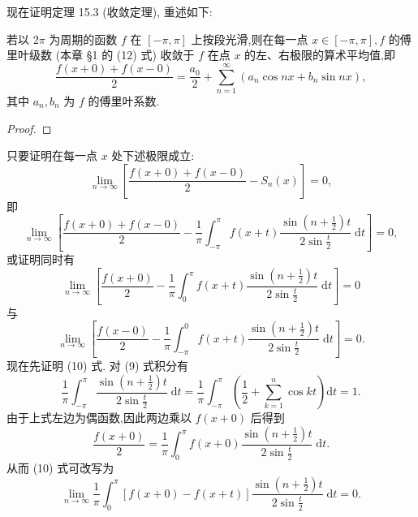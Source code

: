 现在证明定理 15.3 (收敛定理), 重述如下:

若以 \({2\pi }\) 为周期的函数 \(f\) 在 \(\left\lbrack  {-\pi ,\pi }\right\rbrack\) 上按段光滑,则在每一点 \(x \in  \left\lbrack  {-\pi ,\pi }\right\rbrack  ,f\) 的傅里叶级数 (本章 §1 的 (12) 式) 收敛于 \(f\) 在点 \(x\) 的左、右极限的算术平均值,即
\[
\frac{f\left( {x + 0}\right)  + f\left( {x - 0}\right) }{2} = \frac{{a}_{0}}{2} + \mathop{\sum }\limits_{{n = 1}}^{\infty }\left( {{a}_{n}\cos {nx} + {b}_{n}\sin {nx}}\right) ,
\]
其中 \({a}_{n},{b}_{n}\) 为 \(f\) 的傅里叶系数.

\begin{proof}

\end{proof}
只要证明在每一点 \(x\) 处下述极限成立:
\[
\mathop{\lim }\limits_{{n \rightarrow  \infty }}\left\lbrack  {\frac{f\left( {x + 0}\right)  + f\left( {x - 0}\right) }{2} - {S}_{n}\left( x\right) }\right\rbrack   = 0,
\]
即
\[
\mathop{\lim }\limits_{{n \rightarrow  \infty }}\left\lbrack  {\frac{f\left( {x + 0}\right)  + f\left( {x - 0}\right) }{2} - \frac{1}{\pi }{\int }_{-\pi }^{\pi }f\left( {x + t}\right) \frac{\sin \left( {n + \frac{1}{2}}\right) t}{2\sin \frac{t}{2}}\mathrm{\;d}t}\right\rbrack   = 0,
\]
或证明同时有
\[
\mathop{\lim }\limits_{{n \rightarrow  \infty }}\left\lbrack  {\frac{f\left( {x + 0}\right) }{2} - \frac{1}{\pi }{\int }_{0}^{\pi }f\left( {x + t}\right) \frac{\sin \left( {n + \frac{1}{2}}\right) t}{2\sin \frac{t}{2}}\mathrm{\;d}t}\right\rbrack   = 0 \tag{10}
\]
与
\[
\mathop{\lim }\limits_{{n \rightarrow  \infty }}\left\lbrack  {\frac{f\left( {x - 0}\right) }{2} - \frac{1}{\pi }{\int }_{-\pi }^{0}f\left( {x + t}\right) \frac{\sin \left( {n + \frac{1}{2}}\right) t}{2\sin \frac{t}{2}}\mathrm{\;d}t}\right\rbrack   = 0. \tag{11}
\]
现在先证明 (10) 式. 对 (9) 式积分有
\[
\frac{1}{\pi }{\int }_{-\pi }^{\pi }\frac{\sin \left( {n + \frac{1}{2}}\right) t}{2\sin \frac{t}{2}}\mathrm{\;d}t = \frac{1}{\pi }{\int }_{-\pi }^{\pi }\left( {\frac{1}{2} + \mathop{\sum }\limits_{{k = 1}}^{n}\cos {kt}}\right) \mathrm{d}t = 1.
\]
由于上式左边为偶函数,因此两边乘以 \(f\left( {x + 0}\right)\) 后得到
\[
\frac{f\left( {x + 0}\right) }{2} = \frac{1}{\pi }{\int }_{0}^{\pi }f\left( {x + 0}\right) \frac{\sin \left( {n + \frac{1}{2}}\right) t}{2\sin \frac{t}{2}}\mathrm{\;d}t.
\]
从而 (10) 式可改写为
\[
\mathop{\lim }\limits_{{n \rightarrow  \infty }}\frac{1}{\pi }{\int }_{0}^{\pi }\left\lbrack  {f\left( {x + 0}\right)  - f\left( {x + t}\right) }\right\rbrack  \frac{\sin \left( {n + \frac{1}{2}}\right) t}{2\sin \frac{t}{2}}\mathrm{\;d}t = 0. \tag{12}
\]
